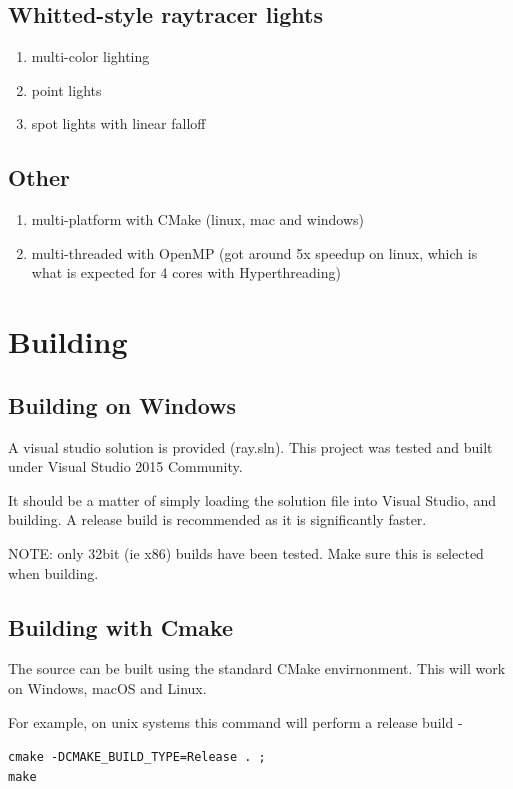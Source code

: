 \subsection{Whitted-style raytracer lights}
    \begin{enumerate}
    \item multi-color lighting
    \item point lights
    \item spot lights with linear falloff
    \end{enumerate}

\subsection{Other}
    \begin{enumerate}
    \item multi-platform with CMake (linux, mac and windows)
    \item multi-threaded with OpenMP (got around 5x speedup on linux, which is what is expected for 4 cores with Hyperthreading)
    \end{enumerate}

\section{Building}

\subsection{Building on Windows}
A visual studio solution is provided (ray.sln). This project was tested and built under Visual Studio 2015 Community. 

It should be a matter of simply loading the solution file into Visual Studio, and building. A release build is recommended as it is significantly faster.

NOTE: only 32bit (ie x86) builds have been tested. Make sure this is selected when building.

\subsection{Building with Cmake}
The source can be built using the standard CMake envirnonment. This will work on Windows, macOS and Linux. 

For example, on unix systems this command will perform a release build -

\verb|cmake -DCMAKE_BUILD_TYPE=Release . ;| \\
\verb|make|

